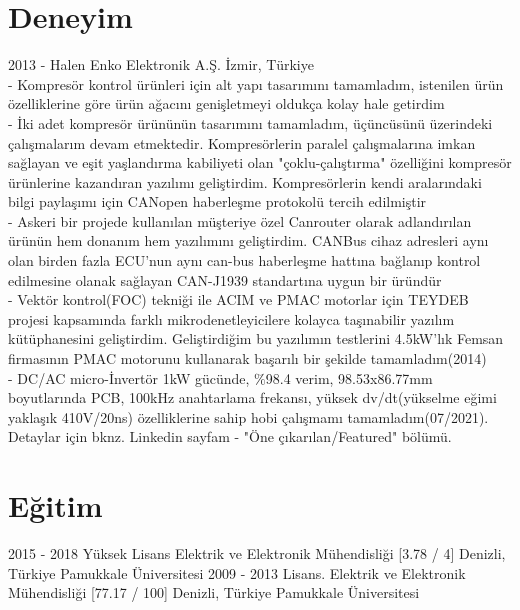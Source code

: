 \documentclass[]{cv-style} %
\begin{document}
\section{Deneyim}
\begin{entrylist}
\entry
  {2013 - Halen}
  {Enko Elektronik A.Ş.}
  {İzmir, Türkiye}
  {\\
- Kompresör kontrol ürünleri için alt yapı tasarımını tamamladım, istenilen ürün özelliklerine göre ürün ağacını genişletmeyi oldukça kolay hale getirdim
\\- İki adet kompresör ürününün tasarımını tamamladım, üçüncüsünü üzerindeki çalışmalarım devam etmektedir. Kompresörlerin paralel çalışmalarına imkan sağlayan ve eşit yaşlandırma kabiliyeti olan "çoklu-çalıştırma" özelliğini kompresör ürünlerine kazandıran yazılımı geliştirdim. Kompresörlerin kendi aralarındaki bilgi paylaşımı için CANopen haberleşme protokolü tercih edilmiştir
\\- Askeri bir projede kullanılan müşteriye özel Canrouter olarak adlandırılan ürünün hem donanım hem yazılımını geliştirdim. CANBus cihaz adresleri aynı olan birden fazla ECU'nun aynı can-bus haberleşme hattına bağlanıp kontrol edilmesine olanak sağlayan CAN-J1939 standartına uygun bir üründür
\\- Vektör kontrol(FOC) tekniği ile ACIM ve PMAC motorlar için TEYDEB projesi kapsamında farklı mikrodenetleyicilere kolayca taşınabilir yazılım kütüphanesini geliştirdim. Geliştirdiğim bu yazılımın testlerini 4.5kW'lık Femsan firmasının PMAC motorunu kullanarak başarılı bir şekilde tamamladım(2014)
\\- DC/AC micro-İnvertör 1kW gücünde, $\%$98.4 verim, 98.53x86.77mm boyutlarında PCB, 100kHz anahtarlama frekansı, yüksek dv/dt(yükselme eğimi yaklaşık 410V/20ns) özelliklerine sahip hobi çalışmamı tamamladım(07/2021). Detaylar için bknz. Linkedin sayfam - "Öne çıkarılan/Featured" bölümü.}
\end{entrylist}
\section{Eğitim}
\begin{entrylist}
\entry
{2015 - 2018}
{Yüksek Lisans {\normalfont Elektrik ve Elektronik Mühendisliği [3.78 / 4]}}
{Denizli, Türkiye}
{Pamukkale Üniversitesi}
\entry
{2009 - 2013}
{Lisans. {\normalfont Elektrik ve Elektronik Mühendisliği [77.17 / 100]}}
{Denizli, Türkiye}
{Pamukkale Üniversitesi}
\end{entrylist} 
\end{document}
